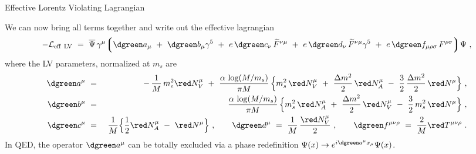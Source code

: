\documentclass[pdf,PItalk,slideColor,colorBG,accumulate]{prosper}
\newcommand{\wt}{\widetilde}
\begin{document}
{
\begin{slide}{ Effective Lorentz Violating Lagrangian }
{
}

	We can now bring all terms together and write out the
	effective lagrangian
\begin{equation*}
 - \mathcal{L}_{\rm eff~LV}
         ~=~ 
\overline{\Psi}\, \gamma^\mu \Big\lgroup 
 {\dgreen a_\mu} ~+~ {\dgreen b_\mu} \gamma^5 
~+~ e\,{\dgreen c_\nu}\,   \wt{F}^{\nu\mu} 
~+~  e\, {\dgreen d_\nu}\,\wt{F}^{\nu\mu} \gamma^5
~+~e\, {\dgreen f_{\mu\rho\sigma}}\,  F^{\rho\sigma} 
\Big\rgroup \Psi~, 
\end{equation*} 
%
	where the LV parameters, normalized at $ m_{s} $ are
\begin{eqnarray*}
\nonumber
        {\dgreen a^\mu} & ~=~ &
         -\, \frac{1}{M}\, m_e^2 {\red N_V^\mu}
        ~+~
        \frac{\alpha\, \log (M/m_s)}{\pi M}\, 
        \Big\{
         m_s^2\, {\red N_V^\mu }
                ~+~
                 \frac{\Delta m^2}{2}\, 
                                   {\red     N_A^\mu}
                ~-~
                \frac{3}{2}\, \frac{\Delta m^2}{2}\, 
                                   {\red       N^\mu }
        \Big\}~ ,
\\
        {\dgreen b^\mu} & ~=~ & 
        \frac{\alpha\,\log (M/m_s)}{\pi M} \, 
        \Big\{
                 m_s^2\, {\red N_A^\mu}
                ~+~
                 \frac{\Delta m^2}{2}\, 
                                       {\red N_V^\mu}
                ~-~
                \frac{3}{2}\, m_s^2\, {\red N^\mu}
        \Big\} ~,
\\
\nonumber
        {\dgreen c^\mu} & ~=~ &
         \frac{1}{M}
        \Big\{ 
                \frac{1}{2}{\red N_A^\mu}
                ~-~
                {\red N^\mu}
        \Big\}~,\qquad 
        {\dgreen d^\mu} ~=~
        \frac{1}{M}\, \frac{\red N_V^\mu}{2} 
~,\qquad 
        {\dgreen f^{\mu\nu\rho}} ~ = ~
        \frac{2}{M} {\red T^{\mu\nu\rho}}
~.
\end{eqnarray*}
%
	In QED, the operator $ {\dgreen a^\mu} $ can be totally
	excluded via a phase redefinition
$ \Psi(x) \to e^{i {\dgreen a^\mu} x_\mu} \Psi(x) $.
\end{slide}
}
\end{document}
